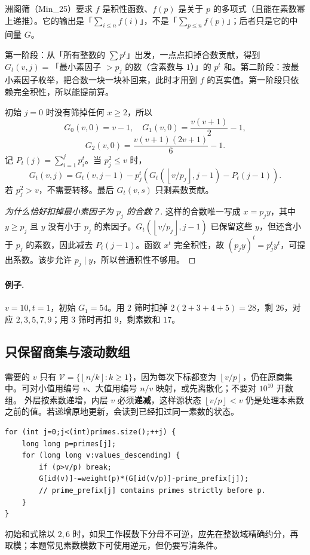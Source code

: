 \documentclass[UTF8,a4paper,11pt,twoside,openright,fontset=fandol]{ctexbook}
\theoremstyle{definition}
\newcommand{\floor}[1]{\left\lfloor #1\right\rfloor}
\begin{document}
\begin{tip}[前提：洲阁筛的要求与它的输出]
洲阁筛（Min\_25）要求 $f$ 是积性函数、$f(p)$ 是关于 $p$ 的多项式（且能在素数幂上递推）。它的输出是「$\sum_{i\le n}f(i)$」，不是「$\sum_{p\le n}f(p)$」；后者只是它的中间量 $G$。
\end{tip}

\begin{tip}[两阶段各自在做什么]
第一阶段：从「所有整数的 $\sum p^t$」出发，一点点扣掉合数贡献，得到 $G_t(v,j)=$「最小素因子 $>p_j$ 的数（含素数与 $1$）」的 $p^t$ 和。第二阶段：按最小素因子枚举，把合数一块一块补回来，此时才用到 $f$ 的真实值。第一阶段只依赖完全积性，所以能提前算。
\end{tip}

初始 $j=0$ 时没有筛掉任何 $x\ge2$，所以
\[
G_0(v,0)=v-1,\quad G_1(v,0)=\frac{v(v+1)}2-1,
\]
\[
G_2(v,0)=\frac{v(v+1)(2v+1)}6-1.
\]
记 $P_t(j)=\sum_{i=1}^jp_i^t$。当 $p_j^2\le v$ 时，
\[
 G_t(v,j)=G_t(v,j-1)-p_j^t
 \left(G_t(\floor{v/p_j},j-1)-P_t(j-1)\right).
\]
若 $p_j^2>v$，不需要转移。最后 $G_t(v,s)$ 只剩素数贡献。


\begin{proof}[为什么恰好扣掉最小素因子为 $p_j$ 的合数？]
这样的合数唯一写成 $x=p_jy$，其中 $y\ge p_j$ 且 $y$ 没有小于 $p_j$ 的素因子。$G_t(\floor{v/p_j},j-1)$ 已保留这些 $y$，但还含小于 $p_j$ 的素数，因此减去 $P_t(j-1)$。函数 $x^t$ 完全积性，故 $(p_jy)^t=p_j^ty^t$，可提出系数。该步允许 $p_j\mid y$，所以普通积性不够用。
\end{proof}
\paragraph{例子.} $v=10,t=1$，初始 $G_1=54$。用 $2$ 筛时扣掉 $2(2+3+4+5)=28$，剩 $26$，对应 $2,3,5,7,9$；用 $3$ 筛时再扣 $9$，剩素数和 $17$。

\subsection{只保留商集与滚动数组}
需要的 $v$ 只有 $\mathcal V=\{\floor{n/k}:k\ge1\}$，因为每次下标都变为 $\floor{v/p}$，仍在原商集中。可对小值用编号 $v$、大值用编号 $n/v$ 映射，或先离散化；不要对 $10^{10}$ 开数组。
外层按素数递增，内层 $v$ 必须\textbf{递减}，这样源状态 $\floor{v/p}<v$ 仍是处理本素数之前的值。若递增原地更新，会读到已经扣过同一素数的状态。
\begin{lstlisting}
for (int j=0;j<(int)primes.size();++j) {
    long long p=primes[j];
    for (long long v:values_descending) {
        if (p>v/p) break;
        G[id(v)]-=weight(p)*(G[id(v/p)]-prime_prefix[j]);
        // prime_prefix[j] contains primes strictly before p.
    }
}
\end{lstlisting}
初始和式除以 $2,6$ 时，如果工作模数下分母不可逆，应先在整数域精确约分，再取模；本题常见素数模数下可使用逆元，但仍要写清条件。
\end{document}
